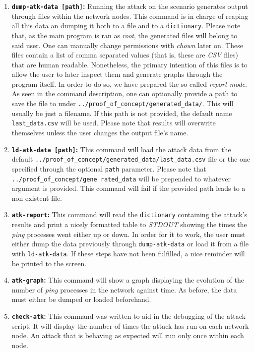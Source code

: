 \begin{enumerate}
                    \item \textbf{\texttt{dump-atk-data [path]}:} Running the attack on the scenario generates output through files within the network nodes. This command is in charge of reaping all this data an dumping it both to a file and to a \texttt{dictionary}. Please note that, as the main program is ran as \textit{root}, the generated files will belong to said user. One can manually change permissions with \textit{chown} later on. These files contain a list of comma separated values (that is, these are \textit{CSV} files) that are human readable. Nonetheless, the primary intention of this files is to allow the user to later inspect them and generate graphs through the program itself. In order to do so, we have prepared the so called \textit{report-mode}. As seen in the command description, one can optionally provide a path to save the file to under \texttt{\allowbreak ../proof\_of\_concept/generated\_data/}. This will usually be just a filename. If this path is not provided, the default name \texttt{last\_data.csv} will be used. Please note that results will overwrite themselves unless the user changes the output file's name.
                    \item \textbf{\texttt{ld-atk-data [path]}:} This command will load the attack data from the default \texttt{\allowbreak../proof\_of\_concept/generated\_data/last\_data.csv} file or the one specified \allowbreak through the optional \texttt{path} parameter. Please note that \texttt{\allowbreak ../proof\_of\_concept/gene rated\_data} will be prepended to whatever argument is provided. This command will fail if the provided path leads to a non existent file.
                    \item \textbf{\texttt{atk-report}:} This command will read the \texttt{dictionary} containing the attack's results and print a nicely formatted table to \textit{STDOUT} showing the times the \textit{ping} processes went either up or down. In order for it to work, the user must either dump the data previously through \texttt{dump-atk-data} or load it from a file with \texttt{ld-atk-data}. If these steps have not been fulfilled, a nice reminder will be printed to the screen.
                    \item \textbf{\texttt{atk-graph}:} This command will show a graph displaying the evolution of the number of \textit{ping} processes in the network against time. As before, the data must either be dumped or loaded beforehand.
                    \item \textbf{\texttt{check-atk}:} This command was written to aid in the debugging of the attack script. It will display the number of times the attack has run on each network node. An attack that is behaving as expected will run only once within each node.

\end{enumerate}
